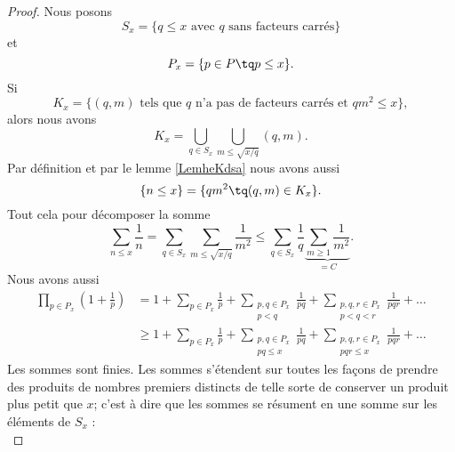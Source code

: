 \begin{proof}
    Nous posons
    \begin{equation}
        S_x=\{  q\leq x\text{ avec } q\text{ sans facteurs carrés} \}
    \end{equation}
    et
    \begin{equation}
        P_x=\{ p\in P\tq p\leq x \}.
    \end{equation}
    Si
    \begin{equation}
        K_x=\{  (q,m)\text{ tels que } q\text{ n'a pas de facteurs carrés et } qm^2\leq x \},
    \end{equation}
    alors nous avons
    \begin{equation}
        K_x=\bigcup_{q\in S_x}\bigcup_{m\leq \sqrt{x/q}}(q,m).
    \end{equation}
    Par définition et par le lemme \ref{LemheKdsa} nous avons aussi
    \begin{equation}
        \{ n\leq x \}=\{ qm^2\tq (q,m)\in K_x \}.
    \end{equation}
    Tout cela pour décomposer la somme
    \begin{equation}        \label{EqpoJpuC}
        \sum_{n\leq x}\frac{1}{ n }=\sum_{q\in S_x}\sum_{m\leq\sqrt{x/q}}\frac{1}{ m^2 }\leq \sum_{q\in S_x}\frac{1}{ q }\underbrace{\sum_{m\geq 1}\frac{1}{ m^2 }}_{=C}.
    \end{equation}
    Nous avons aussi
    \begin{subequations}
        \begin{align}
            \prod_{p\in P_x}\left( 1+\frac{1}{ p } \right)&=1+\sum_{p\in P_x}\frac{1}{ p }+\sum_{\substack{p,q\in P_x\\p<q}}\frac{1}{ pq }+\sum_{\substack{p,q,r\in P_x\\p<q<r}}\frac{1}{ pqr }+\ldots\\
            &\geq 1+\sum_{p\in P_x}\frac{1}{ p }+\sum_{\substack{p,q\in P_x\\pq\leq x}}\frac{1}{ pq }+\sum_{\substack{p,q,r\in P_x\\pqr\leq x}}\frac{1}{ pqr }+\ldots
        \end{align}
    \end{subequations}
    Les sommes sont finies. Les sommes s'étendent sur toutes les façons de prendre des produits de nombres premiers distincts de telle sorte de conserver un produit plus petit que \( x\); c'est à dire que les sommes se résument en une somme sur les éléments de \( S_x\) :
    \begin{equation}        \label{EqooilOz}

\end{equation}
\end{proof}
